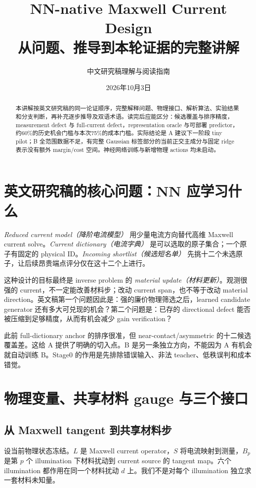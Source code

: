 \documentclass[UTF8,11pt,a4paper,fontset=fandol]{ctexart}
\title{NN-native Maxwell Current Design\\从问题、推导到本轮证据的完整讲解}
\author{中文研究稿理解与阅读指南}
\date{2026年10月3日}
\begin{document}
\maketitle
\begin{abstract}
本讲解按英文研究稿的同一论证顺序，完整解释问题、物理接口、解析算法、实验结果和分支判断，再补充逐步推导及双语术语。读完后应能区分：候选覆盖与排序精度，measurement defect 与 full-current defect，representation oracle 与可部署 predictor，约60\%的历史机会门槛与本次75\%的成本门槛。实际结论是 A 建议下一阶段 tiny pilot；B 全范围数据不足，有完整 Gaussian 标签部分的当前正交主成分与固定 ridge 表示没有额外 margin/cost 空间。神经网络训练与新增物理 actions 均未启动。
\end{abstract}
\tableofcontents\clearpage

\section{英文研究稿的核心问题：NN 应学习什么}
\emph{Reduced current model（降阶电流模型）} 用少量电流方向替代高维 Maxwell current solve。\emph{Current dictionary（电流字典）} 是可以选取的原子集合；一个原子有固定的 physical ID。\emph{Incoming shortlist（候选短名单）} 先挑十二个未选原子，让后续昂贵端点评分仅在这十二个上进行。

这种设计的目标最终是 inverse problem 的 \emph{material update（材料更新）}。观测很强的 current，不一定能改善材料步；改动 current span，也不等于改动 material direction。英文稿第一个问题因此是：强的廉价物理筛选之后，learned candidate generator 还有多大可兑现的机会？第二个问题是：已存的 directional defect 能否被压缩到足够精度，从而有机会减少 gain verification？

此前 full-dictionary anchor 的排序很准，但 near-contact/asymmetric 的十二候选覆盖差。这给 A 提供了明确的切入点。B 是另一条独立方向，不能因为 A 有机会就自动训练 B。Stage0 的作用是先排除错误输入、非法 teacher、低秩误判和成本错觉。

\section{物理变量、共享材料 gauge 与三个接口}
\subsection{从 Maxwell tangent 到共享材料步}
设当前物理状态冻结。$L$ 是 Maxwell current operator，$S$ 将电流映射到测量，$B_p$ 是第 $p$ 个 illumination 下材料扰动到 current source 的 tangent map。六个 illumination 都作用在同一个材料扰动 $d$ 上。我们不是对每个 illumination 独立求一套材料未知量。
\end{document}
